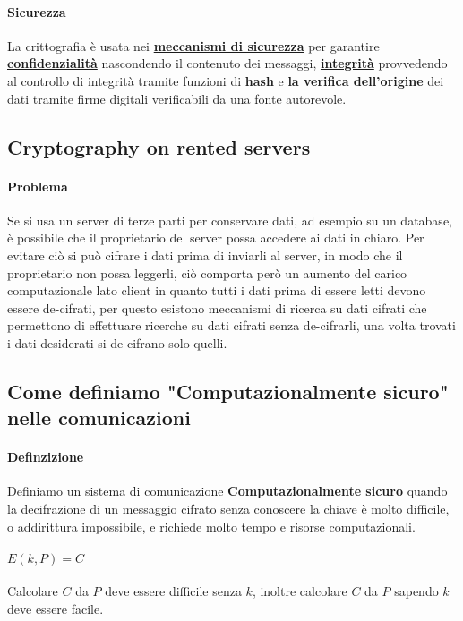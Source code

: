         \paragraph{Sicurezza} La crittografia è usata nei \hyperref[subsec:securityMechanism]{\textbf{meccanismi di sicurezza}} per garantire \hyperref[subPar:confidentiality]{\textbf{confidenzialità}} nascondendo il contenuto dei messaggi, \hyperref[subPar:integrity]{\textbf{integrità}} provvedendo al controllo di integrità tramite funzioni di \textbf{hash} e \textbf{la verifica dell'origine} dei dati tramite firme digitali verificabili da una fonte autorevole.
    \subsection{Cryptography on rented servers}
        \paragraph{Problema} Se si usa un server di terze parti per conservare dati, ad esempio su un database, è possibile che il proprietario del server possa accedere ai dati in chiaro. Per evitare ciò si può cifrare i dati prima di inviarli al server, in modo che il proprietario non possa leggerli, ciò comporta però un aumento del carico computazionale lato client in quanto tutti i dati prima di essere letti devono essere de-cifrati, per questo esistono meccanismi di ricerca su dati cifrati che permettono di effettuare ricerche su dati cifrati senza de-cifrarli, una volta trovati i dati desiderati si de-cifrano solo quelli.
    \subsection{Come definiamo "Computazionalmente sicuro" nelle comunicazioni}
        \paragraph{Definzizione} Definiamo un sistema di comunicazione \textbf{Computazionalmente sicuro} quando la decifrazione di un messaggio cifrato senza conoscere la chiave è molto difficile, o addirittura impossibile, e richiede molto tempo e risorse computazionali.
        \paragraph{$E(k,P)=C$} Calcolare $C$ da $P$ deve essere difficile senza $k$, inoltre calcolare $C$ da $P$ sapendo $k$ deve essere facile.
